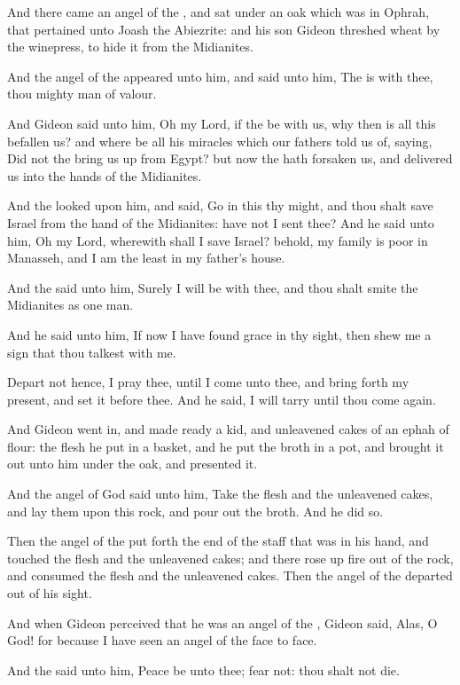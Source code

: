 \verse And there came an angel of the \LORD, and sat under an oak which was in Ophrah, that pertained unto Joash the Abiezrite: and his son Gideon threshed wheat by the winepress, to hide it from the Midianites.

\verse And the angel of the \LORD appeared unto him, and said unto him, The \LORD is with thee, thou mighty man of valour.

\verse And Gideon said unto him, Oh my Lord, if the \LORD be with us, why then is all this befallen us? and where be all his miracles which our fathers told us of, saying, Did not the \LORD bring us up from Egypt?  but now the \LORD hath forsaken us, and delivered us into the hands of the Midianites.

\verse And the \LORD looked upon him, and said, Go in this thy might, and thou shalt save Israel from the hand of the Midianites: have not I sent thee?  \verse And he said unto him, Oh my Lord, wherewith shall I save Israel?  behold, my family is poor in Manasseh, and I am the least in my father's house.

\verse And the \LORD said unto him, Surely I will be with thee, and thou shalt smite the Midianites as one man.

\verse And he said unto him, If now I have found grace in thy sight, then shew me a sign that thou talkest with me.

\verse Depart not hence, I pray thee, until I come unto thee, and bring forth my present, and set it before thee. And he said, I will tarry until thou come again.

\verse And Gideon went in, and made ready a kid, and unleavened cakes of an ephah of flour: the flesh he put in a basket, and he put the broth in a pot, and brought it out unto him under the oak, and presented it.

\verse And the angel of God said unto him, Take the flesh and the unleavened cakes, and lay them upon this rock, and pour out the broth.  And he did so.

\verse Then the angel of the \LORD put forth the end of the staff that was in his hand, and touched the flesh and the unleavened cakes; and there rose up fire out of the rock, and consumed the flesh and the unleavened cakes. Then the angel of the \LORD departed out of his sight.

\verse And when Gideon perceived that he was an angel of the \LORD, Gideon said, Alas, O \LORD God! for because I have seen an angel of the \LORD face to face.

\verse And the \LORD said unto him, Peace be unto thee; fear not: thou shalt not die.


